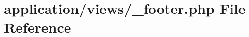 \hypertarget{__footer_8php}{\section{application/views/\-\_\-footer.php File Reference}
\label{__footer_8php}
}
